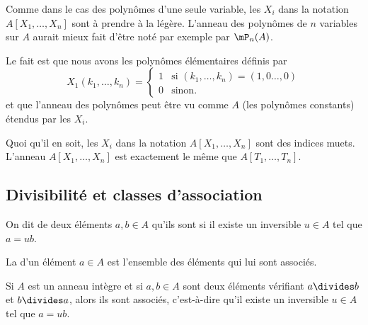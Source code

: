 \begin{normaltext}
	Comme dans le cas des polynômes d'une seule variable, les \( X_i\) dans la notation \( A[X_1,\ldots, X_n]\) sont à prendre à la légère. L'anneau des polynômes de \( n\) variables sur \( A\) aurait mieux fait d'être noté par exemple par \( \mP_n(A)\).

	Le fait est que nous avons les polynômes élémentaires définis par
	\begin{equation}
		X_1(k_1,\ldots, k_n)=\begin{cases}
			1 & \text{si } (k_1,\ldots, k_n)=(1,0\ldots, 0) \\
			0 & \text{sinon. }
		\end{cases}
	\end{equation}
	et que l'anneau des polynômes peut être vu comme \( A\) (les polynômes constants) étendus par les \( X_i\).

	Quoi qu'il en soit, les \( X_i\) dans la notation \( A[X_1,\ldots, X_n]\) sont des indices muets. L'anneau \( A[X_1,\ldots, X_n]\) est exactement le même que \( A[T_1,\ldots, T_n]\).
\end{normaltext}

\subsection{Divisibilité et classes d'association}
\label{DivisibiliteAnneauxIntegres}

\begin{definition}\label{DefrXUixs}
	On dit de deux éléments \( a,b\in A\) qu'ils sont  si il existe un inversible \( u\in A\) tel que \( a=ub\).

	La  d'un élément \( a \in A \) est l'ensemble des éléments qui lui sont associés.
\end{definition}

\begin{lemma}\label{LemRmVTRq}
	Si \( A\) est un anneau intègre et si \( a,b\in A\) sont deux éléments vérifiant \( a\divides b\) et \( b\divides a\), alors ils sont associés, c'est-à-dire qu'il existe un inversible \( u\in A\) tel que \( a=ub\).
\end{lemma}

